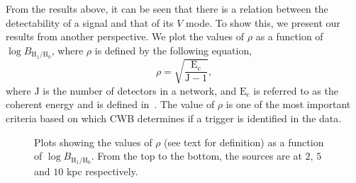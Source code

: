 \documentclass[aps,twocolumn,showpacs,groupedaddress, nofootinbib]{revtex4}  %
\begin{document}
From the results above, it can be seen that there is a relation between the detectability of a signal and that of its $V$ mode.
To show this, we present our results from another perspective.
We plot the values of $\rho$ as a function of $\log B_{\text{H}_1 / \text{H}_0}$, where
$\rho$ is defined by the following equation,
\begin{equation}\label{eq:rho}
 \rho = \sqrt{\frac{\text{E}_{\text{c}}}{\text{J}-1}},
\end{equation}
where $\text{J}$ is the number of detectors in a network, and $\text{E}_{\text{c}}$ is referred to as the coherent energy and is defined in~\cite{klimenko2016method}. 
The value of $\rho$ is one of the most important criteria based on which \ac{CWB} determines if a trigger is identified in the data.
\begin{figure}
     \begin{center}
        \quad
        \quad
    \end{center}
    \caption{Plots showing the values of $\rho$ (see text for definition) as a function of $\log B_{\text{H}_1 / \text{H}_0}$.
    From the top to the bottom, the sources are at $2$, $5$ and $10$ kpc respectively.
    \label{fig:rhovsbf}} 
\end{figure}
\end{document}
